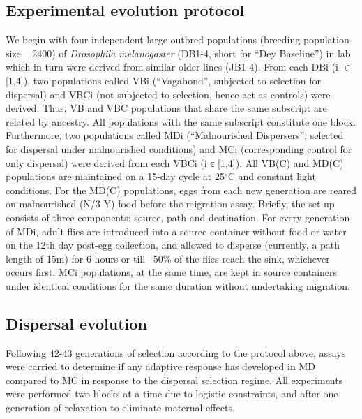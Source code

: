 \documentclass[12pt,onecolumn,twoside]{article}
\begin{document}
	\subsection{Experimental evolution protocol}
	We begin with four independent large outbred populations (breeding population size ~ 2400) of \textit{Drosophila melanogaster} (DB1-4, short for “Dey Baseline”) in lab which in turn were derived from similar older lines (JB1-4). From each DBi (i $\in$ [1,4]), two populations called VBi (“Vagabond”, subjected to selection for dispersal) and VBCi (not subjected to selection, hence act as controls) were derived. Thus, VB and VBC populations that share the same subscript are related by ancestry. All populations with the same subscript constitute one block. Furthermore, two populations called MDi (“Malnourished Dispersers”, selected for dispersal under malnourished conditions) and MCi (corresponding control for only dispersal) were derived from each VBCi (i є [1,4]). All VB(C) and MD(C) populations are maintained on a 15-day cycle at 25$^{\circ}$C and constant light conditions. For the MD(C) populations, eggs from each new generation are reared on malnourished (N/3 Y) food before the migration assay. Briefly, the set-up consists of three components: source, path and destination. For every generation of MDi, adult flies are introduced into a source container without food or water on the 12th day post-egg collection, and allowed to disperse (currently, a path length of 15m) for 6 hours or till ~50\% of the flies reach the sink, whichever occurs first. MCi populations, at the same time, are kept in source containers under identical conditions for the same duration without undertaking migration.
	\subsection{Dispersal evolution}
	Following 42-43 generations of selection according to the protocol above, assays were carried to determine if any adaptive response has developed in MD compared to MC in response to the dispersal selection regime. All experiments were performed two blocks at a time due to logistic constraints, and after one generation of relaxation to eliminate maternal effects.
\end{document}
